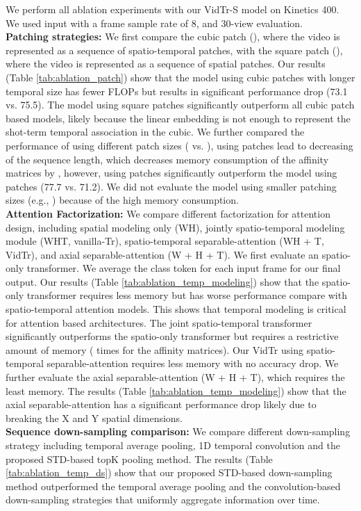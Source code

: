 \documentclass[10pt,twocolumn,letterpaper]{article}
\begin{document}
We perform all ablation experiments with our VidTr-S model on Kinetics 400. We used  input with a frame sample rate of 8, and 30-view evaluation.\\
\textbf{Patching strategies: } 
We first compare the cubic patch (), where the video is represented as a sequence of spatio-temporal patches, with the square patch (), where the video is represented as a sequence of spatial patches. Our results (Table \ref{tab:ablation_patch}) show that the model using cubic patches with longer temporal size has fewer FLOPs but results in significant performance drop (73.1 vs. 75.5). The model using square patches significantly outperform all cubic patch based models, likely because the linear embedding is not enough to represent the shot-term temporal association in the cubic. We further compared the performance of using different patch sizes ( vs. ), using  patches lead to  decreasing of the sequence length, which decreases memory consumption of the affinity matrices by , however, using  patches significantly outperform the model using  patches (77.7 vs. 71.2). We did not evaluate the model using smaller patching sizes (e.g., ) because of the high memory consumption.
\\
\textbf{Attention Factorization:}
We compare different factorization for attention design, including spatial modeling only (WH), jointly spatio-temporal modeling module (WHT, vanilla-Tr), spatio-temporal separable-attention (WH + T, VidTr), and axial separable-attention (W + H + T).
We first evaluate an spatio-only transformer. We average the class token for each input frame for our final output. Our results (Table \ref{tab:ablation_temp_modeling}) show that the spatio-only transformer requires less memory but has worse performance compare with spatio-temporal attention models. This shows that temporal modeling is critical for attention based architectures. The joint spatio-temporal transformer significantly outperforms the spatio-only transformer but requires a restrictive amount of memory ( times for the affinity matrices). Our VidTr using spatio-temporal separable-attention requires  less memory with no accuracy drop. We further evaluate the axial separable-attention (W + H + T), which requires the least memory. The results (Table \ref{tab:ablation_temp_modeling}) show that the axial separable-attention has a significant performance drop likely due to breaking the X and Y spatial dimensions. 
\\
\textbf{Sequence down-sampling comparison: }
We compare different down-sampling strategy including temporal average pooling, 1D temporal convolution and the proposed STD-based topK pooling method. The results (Table \ref{tab:ablation_temp_ds}) show that our proposed STD-based down-sampling method outperformed the temporal average pooling and the convolution-based down-sampling strategies that uniformly aggregate information over time.
\end{document}
